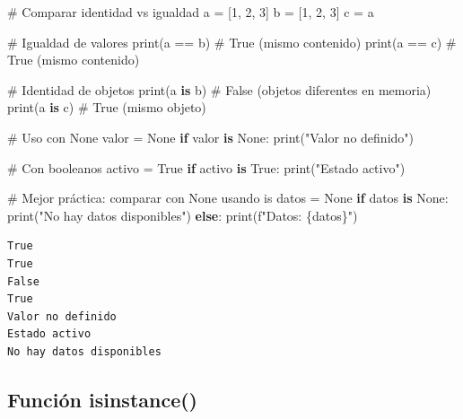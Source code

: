 \documentclass[
  doc,
  floatsintext,
  longtable,
  a4paper,
  nolmodern,
  notxfonts,
  notimes,
  12pt,
  colorlinks=true,linkcolor=blue,citecolor=blue,urlcolor=blue]{apa7}
\newenvironment{Shaded}{\begin{snugshade}}{\end{snugshade}}
\newcommand{\BuiltInTok}[1]{\textcolor[rgb]{0.00,0.23,0.31}{#1}}
\newcommand{\CommentTok}[1]{\textcolor[rgb]{0.37,0.37,0.37}{#1}}
\newcommand{\ControlFlowTok}[1]{\textcolor[rgb]{0.00,0.23,0.31}{\textbf{#1}}}
\newcommand{\DecValTok}[1]{\textcolor[rgb]{0.68,0.00,0.00}{#1}}
\newcommand{\KeywordTok}[1]{\textcolor[rgb]{0.00,0.23,0.31}{\textbf{#1}}}
\newcommand{\NormalTok}[1]{\textcolor[rgb]{0.00,0.23,0.31}{#1}}
\newcommand{\OperatorTok}[1]{\textcolor[rgb]{0.37,0.37,0.37}{#1}}
\newcommand{\SpecialCharTok}[1]{\textcolor[rgb]{0.37,0.37,0.37}{#1}}
\newcommand{\SpecialStringTok}[1]{\textcolor[rgb]{0.13,0.47,0.30}{#1}}
\newcommand{\StringTok}[1]{\textcolor[rgb]{0.13,0.47,0.30}{#1}}
\newcommand{\VariableTok}[1]{\textcolor[rgb]{0.07,0.07,0.07}{#1}}
\begin{document}
\begin{Shaded}
\begin{Highlighting}[]
\CommentTok{\# Comparar identidad vs igualdad}
\NormalTok{a }\OperatorTok{=}\NormalTok{ [}\DecValTok{1}\NormalTok{, }\DecValTok{2}\NormalTok{, }\DecValTok{3}\NormalTok{]}
\NormalTok{b }\OperatorTok{=}\NormalTok{ [}\DecValTok{1}\NormalTok{, }\DecValTok{2}\NormalTok{, }\DecValTok{3}\NormalTok{]}
\NormalTok{c }\OperatorTok{=}\NormalTok{ a}

\CommentTok{\# Igualdad de valores}
\BuiltInTok{print}\NormalTok{(a }\OperatorTok{==}\NormalTok{ b)  }\CommentTok{\# True (mismo contenido)}
\BuiltInTok{print}\NormalTok{(a }\OperatorTok{==}\NormalTok{ c)  }\CommentTok{\# True (mismo contenido)}

\CommentTok{\# Identidad de objetos}
\BuiltInTok{print}\NormalTok{(a }\KeywordTok{is}\NormalTok{ b)  }\CommentTok{\# False (objetos diferentes en memoria)}
\BuiltInTok{print}\NormalTok{(a }\KeywordTok{is}\NormalTok{ c)  }\CommentTok{\# True (mismo objeto)}

\CommentTok{\# Uso con None}
\NormalTok{valor }\OperatorTok{=} \VariableTok{None}
\ControlFlowTok{if}\NormalTok{ valor }\KeywordTok{is} \VariableTok{None}\NormalTok{:}
    \BuiltInTok{print}\NormalTok{(}\StringTok{"Valor no definido"}\NormalTok{)}

\CommentTok{\# Con booleanos}
\NormalTok{activo }\OperatorTok{=} \VariableTok{True}
\ControlFlowTok{if}\NormalTok{ activo }\KeywordTok{is} \VariableTok{True}\NormalTok{:}
    \BuiltInTok{print}\NormalTok{(}\StringTok{"Estado activo"}\NormalTok{)}

\CommentTok{\# Mejor práctica: comparar con None usando \textquotesingle{}is\textquotesingle{}}
\NormalTok{datos }\OperatorTok{=} \VariableTok{None}
\ControlFlowTok{if}\NormalTok{ datos }\KeywordTok{is} \VariableTok{None}\NormalTok{:}
    \BuiltInTok{print}\NormalTok{(}\StringTok{"No hay datos disponibles"}\NormalTok{)}
\ControlFlowTok{else}\NormalTok{:}
    \BuiltInTok{print}\NormalTok{(}\SpecialStringTok{f"Datos: }\SpecialCharTok{\{}\NormalTok{datos}\SpecialCharTok{\}}\SpecialStringTok{"}\NormalTok{)}
\end{Highlighting}
\end{Shaded}

\begin{verbatim}
True
True
False
True
Valor no definido
Estado activo
No hay datos disponibles
\end{verbatim}

\subsection{Función isinstance()}\label{funciuxf3n-isinstance}
\end{document}
